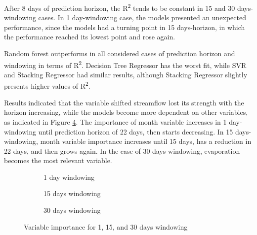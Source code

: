 \documentclass[12pt]{article}
\begin{document}
After 8 days of prediction horizon, the R\textsuperscript{2} tends to be constant in 15 and 30 days-windowing cases. In 1 day-windowing case, the models presented an unexpected performance, since the models had a turning point in 15 days-horizon, in which the performance reached its lowest point and rose again.

Random forest outperforms in all considered cases of prediction horizon and windowing in terms of R\textsuperscript{2}. Decision Tree Regressor has the worst fit, while SVR and Stacking Regressor had similar results, although Stacking Regressor slightly presents higher values of R\textsuperscript{2}.

Results indicated that the variable shifted streamflow lost its strength with the horizon increasing, while the models become more dependent on other variables, as indicated in Figure \ref{fig:CategorizedImportance}. The importance of month variable increases in 1 day-windowing until prediction horizon of 22 days, then starts decreasing. In 15 days-windowing, month variable importance increases until 15 days, has a reduction in 22 days, and then grows again.
In the case of 30 days-windowing, evaporation becomes the most relevant variable.

\begin{figure}[htbp]
    \centering
    \begin{subfigure}[b]{.49\textwidth}
        \centering
        
        \caption{1 day windowing}
        \label{fig:CategorizedImportance01}
    \end{subfigure}
    \begin{subfigure}[b]{.49\textwidth}
        \centering
        
        \caption{15 days windowing}
        \label{fig:CategorizedImportance02}
    \end{subfigure}
    \begin{subfigure}[b]{\textwidth}
        \centering
        
        \captionsetup{justification=justified,singlelinecheck=false}
        \caption{30 days windowing}
        \label{fig:CategorizedImportance03}
    \end{subfigure}
    \caption{Variable importance for  1,  15, and  30 days windowing}
    \label{fig:CategorizedImportance}
\end{figure}
\end{document}
